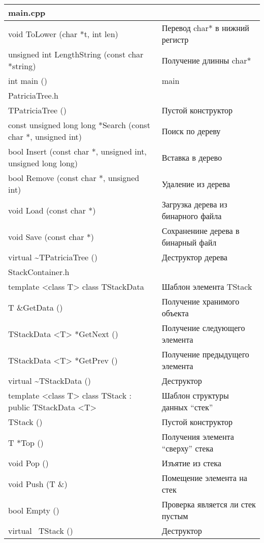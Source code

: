 \documentclass[pdf, unicode, 12pt, a4paper,oneside,fleqn]{article}
\begin{document}
\begin{longtable}{|p{8.4cm}|p{7.5cm}|}
\hline
\rowcolor{lightgray}
\multicolumn{2}{|c|} {main.cpp}\\
\hline
void ToLower (char *t, int len)&Перевод char* в нижний регистр\\
\hline
\hline
unsigned int LengthString (const char *string)&Получение длинны char*\\
\hline
\hline int main ()&main\\
\rowcolor{lightgray}
\multicolumn{2}{|c|} {PatriciaTree.h}\\
\hline
TPatriciaTree ()&Пустой конструктор\\
\hline
\hline
const unsigned long long *Search (const char *, unsigned int)&Поиск по дереву\\
\hline
\hline bool Insert (const char *, unsigned int, unsigned long long)& Вставка в дерево\\
\hline
\hline bool Remove (const char *, unsigned int)& Удаление из дерева\\
\hline void Load (const char *)&Загрузка дерева из бинарного файла\\ \hline
\hline void Save (const char *)&Сохраненине дерева в бинарный файл\\ \hline
\hline virtual \textasciitilde TPatriciaTree ()&Деструктор дерева\\ \hline
\rowcolor{lightgray}
\multicolumn{2}{|c|} {StackContainer.h}\\
\hline template <class T>
class TStackData& Шаблон элемента TStack\\
\hline
\hline  T \&GetData ()& Получение хранимого объекта\\
\hline
\hline TStackData <T> *GetNext ()& Получение следующего элемента\\
\hline
\hline TStackData <T> *GetPrev () & Получение предыдущего элемента\\
\hline
\hline virtual \textasciitilde TStackData ()& Деструктор\\
\hline
\hline template <class T>
class TStack : public TStackData <T>& Шаблон структуры данных \enquote{стек}\\
\hline
\hline  TStack ()& Пустой конструктор\\
\hline  T *Top ()& Получения элемента \enquote{сверху} стека\\
\hline  void Pop ()& Изъятие из стека \\
\hline  void Push (T \&)& Помещение элемента на стек\\
\hline  bool Empty ()& Проверка является ли стек пустым\\
\hline  virtual ~TStack ()& Деструктор\\ \hline
\end{longtable}
\newpage
\end{document}
